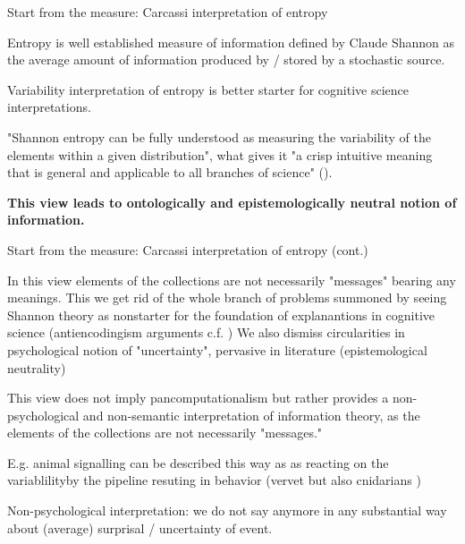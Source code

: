 \documentclass[10pt, aspectratio=169, handout]{beamer}
\begin{document}
\begin{frame}[label=carcassi_entropy] { Start from the measure: Carcassi interpretation of entropy}

   Entropy is well established measure of information defined by Claude Shannon 
    \cite{shannon1949mathematical} as the average amount of information  produced by / stored by a stochastic source. 

    Variability interpretation of entropy \cite{carcassi_variability_2021}  is better starter for cognitive science interpretations. 


"Shannon entropy can be fully understood as measuring the variability of the elements within a given distribution", what gives it "a crisp intuitive meaning that is general and applicable to all branches of science" (\cite{carcassi_variability_2021}).

\textbf{This view leads to ontologically and epistemologically neutral notion of information.
}

\end{frame}

\begin{frame}[label=carcassi_entropy2] { Start from the measure: Carcassi interpretation of entropy (cont.)} 
    
In this view elements of the collections are not necessarily "messages" bearing any meanings. This we get rid of  the whole branch of problems summoned by seeing Shannon theory as nonstarter for the foundation of explanantions in cognitive science  (antiencodingism arguments c.f. \cite{bickhard_interactivist_2009} ) We also dismiss circularities in psychological notion of "uncertainty", pervasive in literature (epistemological neutrality)

This view does not imply pancomputationalism but rather provides a non-psychological and non-semantic interpretation of information theory, as the elements of the collections are not necessarily "messages."

E.g. animal signalling can be described this way as as reacting on the variablilityby the pipeline resuting in behavior (vervet but also cnidarians )


Non-psychological interpretation: we do not say anymore in any substantial way about (average) surprisal / uncertainty of event.
 

\end{frame}
\end{document}
